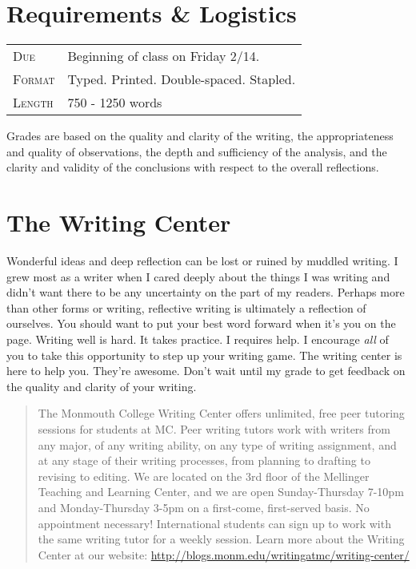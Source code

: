 \documentclass[]{tufte-handout}
\begin{document}
\section{Requirements \& Logistics}

\begin{tabular}{ll}
\textsc{Due} & Beginning of class on Friday 2/14. \\
\textsc{Format} & Typed. Printed. Double-spaced. Stapled. \\
\textsc{Length} & 750 - 1250 words 
\end{tabular}

Grades are based on the quality and clarity of the writing, the appropriateness and quality of observations, the depth and sufficiency of the analysis, and the clarity and validity of the conclusions with respect to the overall reflections.  

\section{The Writing Center}

Wonderful ideas and deep reflection can be lost or ruined by muddled writing.  I grew most as a writer when I cared deeply about the things I was writing and didn't want there to be any uncertainty on the part of my readers. Perhaps more than other forms or writing, reflective writing is ultimately a reflection of ourselves. You should want to put your best word forward when it's you on the page. Writing well is hard. It takes practice. I requires help. I encourage \textit{all} of you to take this opportunity to step up your writing game. The writing center is here to help you. They're awesome. Don't wait until my grade to get feedback on the quality and clarity of your writing.  
\begin{quote}
The Monmouth College Writing Center offers unlimited, free peer tutoring sessions for students at MC.  Peer writing tutors work with writers from any major, of any writing ability, on any type of writing assignment, and at any stage of their writing processes, from planning to drafting to revising to editing.  We are located on the 3rd floor of the Mellinger Teaching and Learning Center, and we are open Sunday-Thursday 7-10pm and Monday-Thursday 3-5pm on a first-come, first-served basis.  No appointment necessary!  International students can sign up to work with the same writing tutor for a weekly session. Learn more about the Writing Center at our website: \url{http://blogs.monm.edu/writingatmc/writing-center/}
\end{quote}
\end{document}
